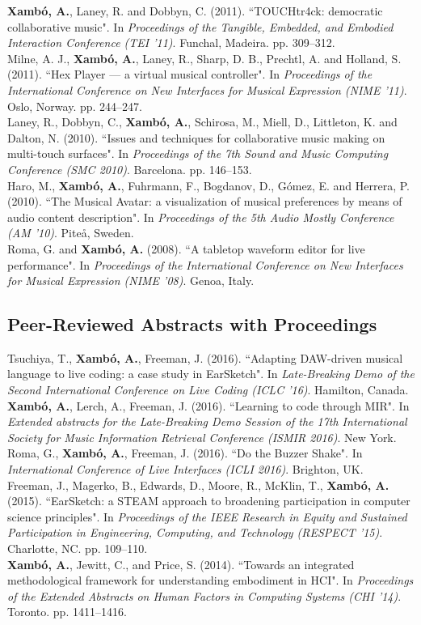 \documentclass[10pt, a4paper]{article}
\newcommand{\years}[1]{\marginnote{\scriptsize #1}}
\begin{document}
\years{2011b}\textbf{Xambó, A.}, Laney, R. and Dobbyn, C. (2011). “TOUCHtr4ck: democratic collaborative music". In \emph{Proceedings of the Tangible, Embedded, and Embodied Interaction Conference (TEI '11)}. Funchal, Madeira. pp. 309--312.\\
\years{2011a}Milne, A. J., \textbf{Xambó, A.}, Laney, R., Sharp, D. B., Prechtl, A. and Holland, S. (2011). “Hex Player — a virtual musical controller". In \emph{Proceedings of the International Conference on New Interfaces for Musical Expression (NIME '11)}. Oslo, Norway. pp. 244--247.\\
\years{2010b}Laney, R., Dobbyn, C., \textbf{Xambó, A.}, Schirosa, M., Miell, D., Littleton, K. and Dalton, N. (2010). “Issues and techniques for collaborative music making on multi-touch surfaces". In \emph{Proceedings of the 7th Sound and Music Computing Conference (SMC 2010)}. Barcelona. pp. 146–153.\\
\years{2010a}Haro, M., \textbf{Xambó, A.}, Fuhrmann, F., Bogdanov, D., Gómez, E. and Herrera, P. (2010). “The Musical Avatar: a visualization of musical preferences by means of audio content description". In \emph{Proceedings of the 5th Audio Mostly Conference (AM '10)}. Piteå, Sweden.\\
\years{2008}Roma, G. and \textbf{Xambó, A.} (2008). “A tabletop waveform editor for live performance". In \emph{Proceedings of the International Conference on New Interfaces for Musical Expression (NIME '08)}. Genoa, Italy.\\

\subsection*{Peer-Reviewed Abstracts with Proceedings}
\noindent
\years{2016c}Tsuchiya, T., \textbf{Xambó, A.}, Freeman, J. (2016). “Adapting DAW-driven musical language to live coding: a case study in EarSketch". In \emph{Late-Breaking Demo of the Second International Conference on Live Coding (ICLC '16)}. Hamilton, Canada.\\ 
\years{2016b}\textbf{Xambó, A.}, Lerch, A., Freeman, J. (2016). “Learning to code through MIR". In \emph{Extended abstracts for the Late-Breaking Demo Session of the 17th International Society for Music Information Retrieval Conference (ISMIR 2016)}. New York.\\
\years{2016a}Roma, G., \textbf{Xambó, A.}, Freeman, J. (2016). “Do the Buzzer Shake". In \emph{International Conference of Live Interfaces (ICLI 2016)}. Brighton, UK.\\
\years{2015}Freeman, J., Magerko, B., Edwards, D., Moore, R., McKlin, T., \textbf{Xambó, A.} (2015). “EarSketch: a STEAM approach to broadening participation in computer science principles". In \emph{Proceedings of the IEEE Research in Equity and Sustained Participation in Engineering, Computing, and Technology (RESPECT '15)}. Charlotte, NC. pp. 109--110.\\
\years{2014}\textbf{Xambó, A.}, Jewitt, C., and Price, S. (2014). “Towards an integrated methodological framework for understanding embodiment in HCI". In \emph{Proceedings of the Extended Abstracts on Human Factors in Computing Systems (CHI '14)}. Toronto. pp. 1411--1416.
\end{document}
